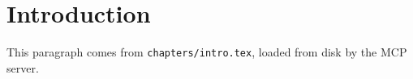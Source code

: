 \section{Introduction}
This paragraph comes from \texttt{chapters/intro.tex}, loaded from disk by the MCP server.
